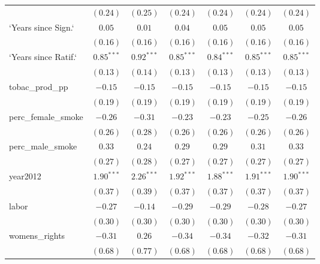 \begin{table}[!h]
\begin{center}
\begin{tabular}{l c c c c c c }
                        & $(0.24)$     & $(0.25)$     & $(0.24)$     & $(0.24)$     & $(0.24)$     & $(0.24)$     \\
`Years since Sign.`     & $0.05$       & $0.01$       & $0.04$       & $0.05$       & $0.05$       & $0.05$       \\
                        & $(0.16)$     & $(0.16)$     & $(0.16)$     & $(0.16)$     & $(0.16)$     & $(0.16)$     \\
`Years since Ratif.`    & $0.85^{***}$ & $0.92^{***}$ & $0.85^{***}$ & $0.84^{***}$ & $0.85^{***}$ & $0.85^{***}$ \\
                        & $(0.13)$     & $(0.14)$     & $(0.13)$     & $(0.13)$     & $(0.13)$     & $(0.13)$     \\
tobac\_prod\_pp         & $-0.15$      & $-0.15$      & $-0.15$      & $-0.15$      & $-0.15$      & $-0.15$      \\
                        & $(0.19)$     & $(0.19)$     & $(0.19)$     & $(0.19)$     & $(0.19)$     & $(0.19)$     \\
perc\_female\_smoke     & $-0.26$      & $-0.31$      & $-0.23$      & $-0.23$      & $-0.25$      & $-0.26$      \\
                        & $(0.26)$     & $(0.28)$     & $(0.26)$     & $(0.26)$     & $(0.26)$     & $(0.26)$     \\
perc\_male\_smoke       & $0.33$       & $0.24$       & $0.29$       & $0.29$       & $0.31$       & $0.33$       \\
                        & $(0.27)$     & $(0.28)$     & $(0.27)$     & $(0.27)$     & $(0.27)$     & $(0.27)$     \\
year2012                & $1.90^{***}$ & $2.26^{***}$ & $1.92^{***}$ & $1.88^{***}$ & $1.91^{***}$ & $1.90^{***}$ \\
                        & $(0.37)$     & $(0.39)$     & $(0.37)$     & $(0.37)$     & $(0.37)$     & $(0.37)$     \\
labor                   & $-0.27$      & $-0.14$      & $-0.29$      & $-0.29$      & $-0.28$      & $-0.27$      \\
                        & $(0.30)$     & $(0.30)$     & $(0.30)$     & $(0.30)$     & $(0.30)$     & $(0.30)$     \\
womens\_rights          & $-0.31$      & $0.26$       & $-0.34$      & $-0.34$      & $-0.32$      & $-0.31$      \\
                        & $(0.68)$     & $(0.77)$     & $(0.68)$     & $(0.68)$     & $(0.68)$     & $(0.68)$     \\

\end{tabular}
\end{center}
\end{table}
